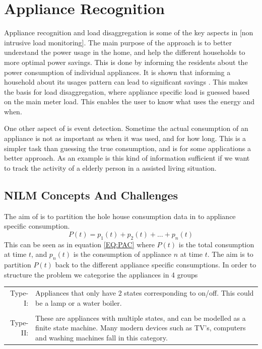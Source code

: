 \chapter{Appliance Recognition }
\label{sec:AppRec}
Appliance recognition and load disaggregation is some of the key aspects in [non intrusive load monitoring]. The main purpose of the  approach is to better understand the power usage in the home, and help the different households to more optimal power savings. This is done by informing the residents about the power consumption of individual appliances. It is shown that informing a household about its usages pattern can lead to significant savings \citep{RefWorks:33}. This makes the basis for load disaggregation, where appliance specific load is guessed based on the main meter load. This enables the user to know what uses the energy and when.

One other aspect of  is event detection. Sometime the actual consumption of an appliance is not as important as when it was used, and for how long. This is a simpler task than guessing the true consumption, and is for some applications a better approach. As an example is this kind of information sufficient if we want to track the activity of a elderly person in a assisted living situation. 

\section{NILM Concepts And Challenges} 
The aim of  is to partition the hole house consumption data in to appliance specific consumption. 
\begin{equation}
	P(t) = p_1(t) + p_2(t) + ... + p_n(t)
	\label{EQ:PAC}
\end{equation}
This can be seen as in equation \ref{EQ:PAC} where $P(t)$ is the total consumption at time $t$, and $p_n(t)$ is the consumption of appliance $n$ at time $t$. The aim is to partition $P(t)$ back to the different appliance specific consumptions. In order to structure the problem we categorise the appliances in 4 groups\citep{RefWorks:17} 

\begin{tabularx}{\linewidth}{ r X }
Type-I:&Appliances that only have 2 states corresponding to on/off. This could be a lamp or a water boiler. \\
\\
Type-II:&These are appliances with multiple states, and can be modelled as a finite state machine. Many modern devices such as TV's, computers and washing machines fall in this category.   \\
\end{tabularx}

